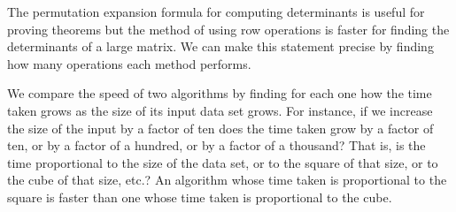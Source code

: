 The permutation expansion formula for computing determinants is useful 
for proving theorems but the method of using row operations
is faster for finding the determinants of a large matrix.
We can make this statement 
precise by finding how many operations each method performs.

We compare the speed of two algorithms by finding for each one
how the time taken grows as the size of
its input data set grows.
For instance, if we increase the size of the input by a
factor of ten does the time taken grow by a factor of ten,
or by a factor of a hundred, or by a factor of a thousand?
That is, 
is the time proportional to the size of the data set, 
or to the square of that size, or to the cube of that size, etc.? 
An algorithm whose time taken is proportional to the square is faster than
one whose time taken is proportional to the cube.

